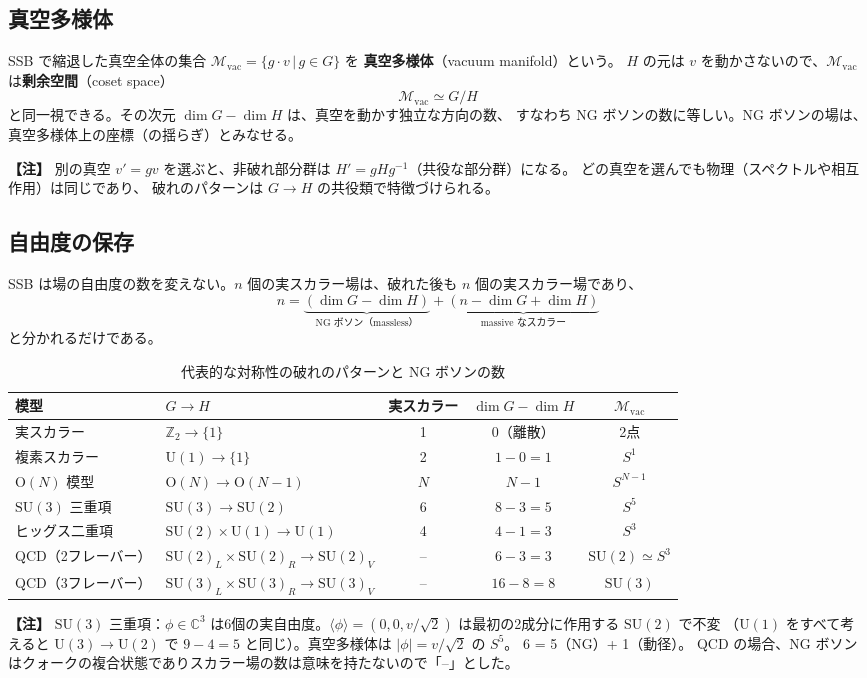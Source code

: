 \documentclass[uplatex,dvipdfmx,a4paper,11pt,openany]{jsbook}
\newcommand{\term}[2]{\textbf{#1}（#2）}
\newenvironment{note}{\vspace{1ex}\par\footnotesize\noindent\textbf{【注】}}{\par\vspace{1ex}}
\numberwithin{equation}{chapter}
\theoremstyle{definition}
\theoremstyle{plain}
\theoremstyle{remark}
\newcommand{\SU}{\mathrm{SU}}
\newcommand{\U}{\mathrm{U}}
\begin{document}
\subsection{真空多様体}
SSB で縮退した真空全体の集合 $\mathcal M_{\mathrm{vac}}=\{g\cdot v\,|\,g\in G\}$ を
\term{真空多様体}{vacuum manifold}という。
$H$ の元は $v$ を動かさないので、$\mathcal M_{\mathrm{vac}}$ は\term{剰余空間}{coset space}
\begin{equation}
\mathcal M_{\mathrm{vac}}\simeq G/H
\end{equation}
と同一視できる。その次元 $\dim G-\dim H$ は、真空を動かす独立な方向の数、
すなわち NG ボソンの数に等しい。NG ボソンの場は、真空多様体上の座標（の揺らぎ）とみなせる。
\begin{note}
別の真空 $v'=gv$ を選ぶと、非破れ部分群は $H'=gHg^{-1}$（共役な部分群）になる。
どの真空を選んでも物理（スペクトルや相互作用）は同じであり、
破れのパターンは $G\to H$ の共役類で特徴づけられる。
\end{note}
\subsection{自由度の保存}
SSB は場の自由度の数を変えない。$n$ 個の実スカラー場は、破れた後も $n$ 個の実スカラー場であり、
\begin{equation}
n=\underbrace{(\dim G-\dim H)}_{\text{NG ボソン（massless）}}+\underbrace{(n-\dim G+\dim H)}_{\text{massive なスカラー}}
\end{equation}
と分かれるだけである。
\begin{table}[htbp]
\centering
\caption{代表的な対称性の破れのパターンと NG ボソンの数}
\label{tab:SSB-patterns}
\begin{tabular}{llccc}
\toprule
模型 & $G\to H$ & 実スカラー & $\dim G-\dim H$ & $\mathcal M_{\mathrm{vac}}$\\
\midrule
実スカラー & $\mathbb Z_2\to\{1\}$ & 1 & 0（離散） & 2点\\
複素スカラー & $\U(1)\to\{1\}$ & 2 & $1-0=1$ & $S^1$\\
$\mathrm O(N)$ 模型 & $\mathrm O(N)\to\mathrm O(N-1)$ & $N$ & $N-1$ & $S^{N-1}$\\
$\SU(3)$ 三重項 & $\SU(3)\to\SU(2)$ & 6 & $8-3=5$ & $S^5$\\
ヒッグス二重項 & $\SU(2)\times\U(1)\to\U(1)$ & 4 & $4-1=3$ & $S^3$\\
QCD（2フレーバー） & $\SU(2)_L\times\SU(2)_R\to\SU(2)_V$ & -- & $6-3=3$ & $\SU(2)\simeq S^3$\\
QCD（3フレーバー） & $\SU(3)_L\times\SU(3)_R\to\SU(3)_V$ & -- & $16-8=8$ & $\SU(3)$\\
\bottomrule
\end{tabular}
\end{table}
\begin{note}
$\SU(3)$ 三重項：$\phi\in\mathbb C^3$ は6個の実自由度。$\langle\phi\rangle=(0,0,v/\sqrt2)$ は最初の2成分に作用する $\SU(2)$ で不変
（$\U(1)$ をすべて考えると $\U(3)\to\U(2)$ で $9-4=5$ と同じ）。真空多様体は $|\phi|=v/\sqrt2$ の $S^5$。
6 = 5（NG）+ 1（動径）。
QCD の場合、NG ボソンはクォークの複合状態でありスカラー場の数は意味を持たないので「--」とした。
\end{note}
\end{document}
